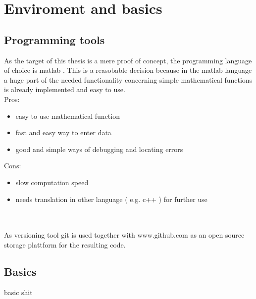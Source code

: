 \chapter{Enviroment and basics}
\label{cha:enviromentandbasics}

\section{Programming tools}
As the target of this thesis is a mere proof of concept, the programming language of choice is matlab \cite{tool:matlab}. This is a reasobable decision because in the matlab language a huge part of the needed functionality concerning simple mathematical functions is already implemented and easy to use. \\
Pros:
\begin{itemize}
\item easy to use mathematical function
\item fast and easy way to enter data
\item good and simple ways of debugging and locating errors 
\end{itemize}
Cons:
\begin{itemize}
\item slow computation speed
\item needs translation in other language ( e.g. c++ ) for further use
\end{itemize}
\\\\
As versioning tool git \cite{tool:git} is used together with www.github.com as an open source storage plattform for the resulting code.

\section{Basics}
basic shit